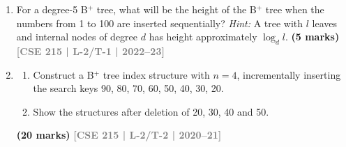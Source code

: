 \documentclass[12pt]{article}
\newcommand{\yr}[1]{\hfill\textcolor{gray}{\small\textbf{[#1]}}}
\newcommand{\mk}[1]{\textcolor{orange!70!black}{\small\textbf{(#1 marks)}}}
\begin{document}
\begin{enumerate}
\begin{center}

\end{center}
Draw the state of this B$^+$ tree after each of the following operations:
\begin{enumerate}
  \item Insert 315
  \item Insert 409 and 513
  \item Delete 456
  \item Delete 513
  \item Delete 982 and 895
\end{enumerate}
\mk{20} \yr{CSE 215 | L-2/T-1 | 2022--23}


\item For a degree-5 B$^+$ tree, what will be the height of the B$^+$ tree when the numbers from 1 to 100 are inserted sequentially? \textit{Hint:} A tree with $l$ leaves and internal nodes of degree $d$ has height approximately $\log_d l$.
\mk{5} \yr{CSE 215 | L-2/T-1 | 2022--23}



\item
\begin{enumerate}
  \item Construct a B$^+$ tree index structure with $n = 4$, incrementally inserting the search keys 90, 80, 70, 60, 50, 40, 30, 20.
  \item Show the structures after deletion of 20, 30, 40 and 50.
\end{enumerate}
\mk{20} \yr{CSE 215 | L-2/T-2 | 2020--21}



\end{enumerate}
\end{document}
